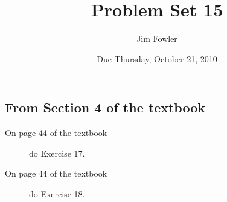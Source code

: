 \documentclass[12pt]{handout}
\author{Jim Fowler}
\title{Problem Set 15}
\date{Due Thursday, October 21, 2010}
\begin{document}
\maketitle










\subsection*{From Section 4 of the textbook}



\begin{description}

\item[On page 44 of the textbook] do Exercise 17.

\item[On page 44 of the textbook] do Exercise 18.

\end{description}
\end{document}
